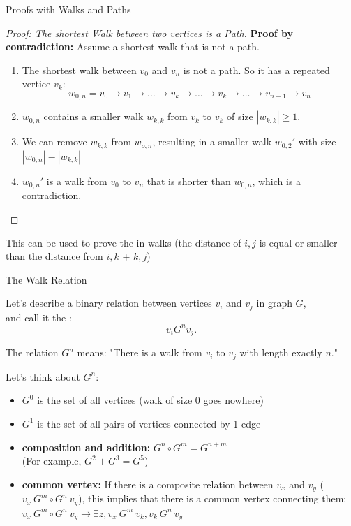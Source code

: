 \begin{frame}{Proofs with Walks and Paths}
  \begin{proof}[Proof: The shortest Walk between two vertices is a Path]
    {\bf Proof by contradiction:} Assume a shortest walk that is not a path.

    \begin{enumerate}
    \item The shortest walk between $v_0$ and $v_n$ is not a path. So it has a repeated vertice $v_k$:
    \begin{equation*}
      w_{0,n} = v_0 \to v_1 \to \ldots \to v_k \to \ldots \to v_k \to \ldots \to v_{n-1} \to v_n
    \end{equation*}

    \item $w_{0,n}$  contains a smaller walk $w_{k,k}$ from $v_k$ to $v_k$ of size $|w_{k,k}| \geq 1$.
    \item We can remove $w_{k,k}$ from $w_{o,n}$, resulting in a smaller walk $w_{0,2}'$ with size $|w_{0,n}| - |w_{k,k}|$
    \item $w_{0,n}'$ is a walk from $v_0$ to $v_n$ that is shorter than $w_{0,n}$, which is a contradiction.
    \end{enumerate}
  \end{proof}

  This can be used to prove the  in walks (the distance of $i,j$ is equal or smaller than the distance from $i,k$ + $k,j$)

\end{frame}

\begin{frame}[t]{The Walk Relation}

  Let's describe a binary relation between vertices $v_i$ and $v_j$ in graph $G$,\\ and call it the : 
  \begin{equation*}
    v_i G^n v_j.
  \end{equation*}

  The relation $G^n$ means: "There is a walk from $v_i$ to $v_j$ with length exactly $n$."\bigskip

  Let's think about $G^n$:
  \begin{itemize}
    \item $G^0$ is the set of all vertices (walk of size 0 goes nowhere)
    \item $G^1$ is the set of all pairs of vertices connected by 1 edge    
    \item {\bf composition and addition:} $G^n \circ G^m = G^{n+m}$ \hspace{.5cm}\\
    (For example, $G^2 + G^3 = G^5$)
    \item {\bf common vertex:} If there is a composite relation between $v_x$ and $v_y$ ($v_x~G^m \circ G^n~v_y$), this implies that there is a common vertex connecting them:\\
    $v_x~G^m \circ G^n~v_y\rightarrow \exists z, v_x~G^m~v_k, v_k~G^n~v_y$

  \end{itemize}
\end{frame}

